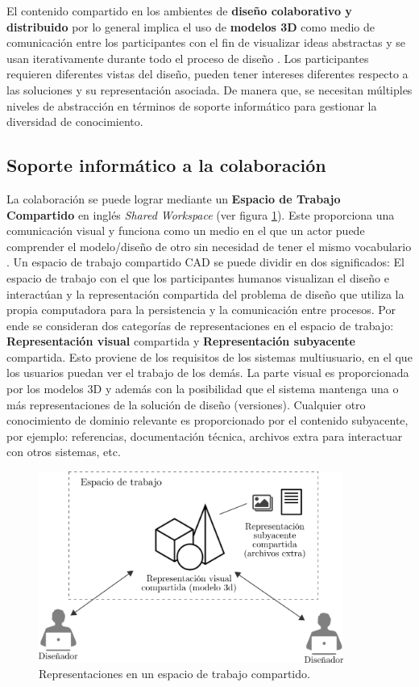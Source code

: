 El contenido compartido en los ambientes de \textbf{diseño colaborativo y distribuido} por lo general implica el uso de \textbf{modelos 3D} como medio de comunicación entre los participantes con el fin de visualizar ideas abstractas y se usan iterativamente durante todo el proceso de diseño \citep{Tek-JinNam2009}. Los participantes requieren diferentes vistas del diseño, pueden tener intereses diferentes respecto %
a las soluciones y su representación asociada. De manera que, se necesitan múltiples niveles de abstracción en términos de soporte informático para gestionar la diversidad de conocimiento. %


\subsection{Soporte informático a la colaboración }
La colaboración se puede lograr mediante un \textbf{Espacio de Trabajo Compartido} en inglés \textit{\Gls{Shared Workspace}}  (ver figura \ref{fig:sistemashared}). 
Este proporciona una comunicación visual y funciona como un medio en el que un actor puede comprender el modelo/diseño de otro sin necesidad de tener el mismo vocabulario \citep{Maher2006}. 
Un espacio de trabajo compartido CAD se puede dividir en dos significados: El espacio de trabajo con el que los participantes humanos visualizan el diseño e interactúan y la representación compartida del problema de diseño que utiliza la propia computadora para la persistencia y la comunicación entre procesos. Por ende se consideran dos categorías de representaciones en el espacio de trabajo: \textbf{{Representación visual}} compartida y \textbf{Representación subyacente} compartida. Esto proviene de los requisitos de los sistemas multiusuario, en el que los usuarios puedan ver el trabajo de los demás. La parte visual es proporcionada por los modelos 3D y además con la posibilidad que el sistema mantenga una o más representaciones de la solución de diseño (versiones). Cualquier otro conocimiento de dominio relevante es proporcionado por el contenido subyacente, por ejemplo: referencias, documentación técnica, archivos extra para interactuar con otros sistemas, etc.

\begin{figure}[ht]
\includegraphics[width=10cm]{Img/CPD/cad-shared.png}
\centering
\caption{\footnotesize{Representaciones en un espacio de trabajo compartido.}}
\label{fig:sistemashared}
\end{figure}

